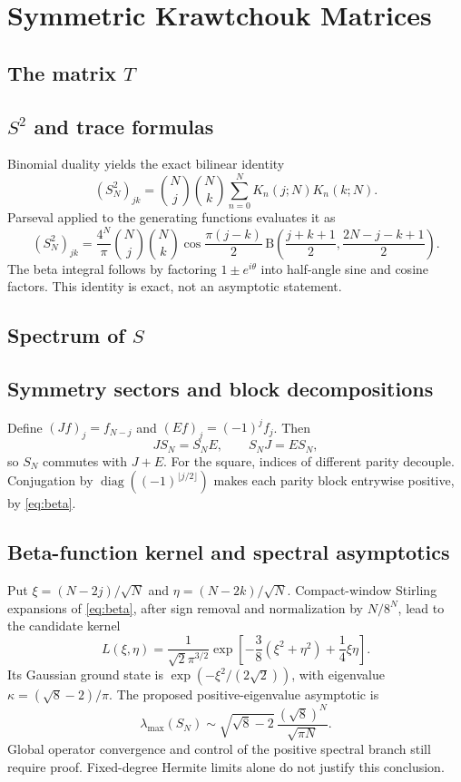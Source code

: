 \chapter{Symmetric Krawtchouk Matrices}
\label{ch:16}
\section{The matrix $T$}
\label{sec:16-1}

\section{$S^2$ and trace formulas}
\label{sec:16-2}
Binomial duality yields the exact bilinear identity
\[
(S_N^2)_{jk}=\binom Nj\binom Nk\sum_{n=0}^NK_n(j;N)K_n(k;N).
\]
Parseval applied to the generating functions evaluates it as
\begin{equation}\label{eq:beta}
(S_N^2)_{jk}=\frac{4^N}{\pi}\binom Nj\binom Nk
\cos\frac{\pi(j-k)}2\,
\mathrm B\left(\frac{j+k+1}{2},\frac{2N-j-k+1}{2}\right).
\end{equation}
The beta integral follows by factoring $1\pm e^{i\theta}$ into half-angle sine and cosine factors. This identity is exact, not an asymptotic statement.

\section{Spectrum of $S$}
\label{sec:16-3}

\section{Symmetry sectors and block decompositions}
\label{sec:16-4}
Define $(Jf)_j=f_{N-j}$ and $(Ef)_j=(-1)^jf_j$. Then
\[
JS_N=S_NE,\qquad S_NJ=ES_N,
\]
so $S_N$ commutes with $J+E$. For the square, indices of different parity decouple. Conjugation by $\operatorname{diag}((-1)^{\lfloor j/2\rfloor})$ makes each parity block entrywise positive, by \eqref{eq:beta}.

\section{Beta-function kernel and spectral asymptotics}
\label{sec:16-5}
\begin{remark}
Put $\xi=(N-2j)/\sqrt N$ and $\eta=(N-2k)/\sqrt N$. Compact-window Stirling expansions of \eqref{eq:beta}, after sign removal and normalization by $N/8^N$, lead to the candidate kernel
\[
L(\xi,\eta)=\frac{1}{\sqrt2\pi^{3/2}}
\exp\left[-\frac38(\xi^2+\eta^2)+\frac14\xi\eta\right].
\]
Its Gaussian ground state is $\exp(-\xi^2/(2\sqrt2))$, with eigenvalue $\kappa=(\sqrt8-2)/\pi$. The proposed positive-eigenvalue asymptotic is
\[
\lambda_{\max}(S_N)\sim\sqrt{\sqrt8-2}\,
\frac{(\sqrt8)^N}{\sqrt{\pi N}}.
\]
Global operator convergence and control of the positive spectral branch still require proof. Fixed-degree Hermite limits alone do not justify this conclusion.
\end{remark}

